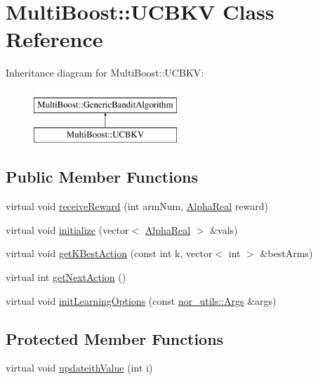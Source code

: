 \hypertarget{classMultiBoost_1_1UCBKV}{\section{Multi\-Boost\-:\-:U\-C\-B\-K\-V Class Reference}
\label{classMultiBoost_1_1UCBKV}
}
Inheritance diagram for Multi\-Boost\-:\-:U\-C\-B\-K\-V\-:\begin{figure}[H]
\begin{center}
\leavevmode
\includegraphics[height=2.000000cm]{classMultiBoost_1_1UCBKV}
\end{center}
\end{figure}
\subsection*{Public Member Functions}
\begin{DoxyCompactItemize}
\item 
virtual void \hyperlink{classMultiBoost_1_1UCBKV_a0750e66519a6ee5161c440260926aa91}{receive\-Reward} (int arm\-Num, \hyperlink{Defaults_8h_a80184c4fd10ab70a1a17c5f97dcd1563}{Alpha\-Real} reward)
\item 
virtual void \hyperlink{classMultiBoost_1_1UCBKV_abdfa761ad053042bc9898aa11e59ff8f}{initialize} (vector$<$ \hyperlink{Defaults_8h_a80184c4fd10ab70a1a17c5f97dcd1563}{Alpha\-Real} $>$ \&vals)
\item 
virtual void \hyperlink{classMultiBoost_1_1UCBKV_aabc2a1ba83bea7a37e09d8b8a62db0fe}{get\-K\-Best\-Action} (const int k, vector$<$ int $>$ \&best\-Arms)
\item 
virtual int \hyperlink{classMultiBoost_1_1UCBKV_af502e23119cc97b8fd2e2afbe6f0dbc4}{get\-Next\-Action} ()
\item 
virtual void \hyperlink{classMultiBoost_1_1UCBKV_ae1cf00a8c9446c2590f7b5a2129765f8}{init\-Learning\-Options} (const \hyperlink{classnor__utils_1_1Args}{nor\-\_\-utils\-::\-Args} \&args)
\end{DoxyCompactItemize}
\subsection*{Protected Member Functions}
\begin{DoxyCompactItemize}
\item 
virtual void \hyperlink{classMultiBoost_1_1UCBKV_a4dca42657cf26182b60ecdf635c01b49}{updateith\-Value} (int i)
\end{DoxyCompactItemize}
